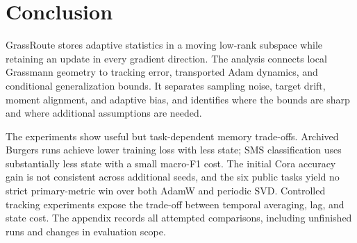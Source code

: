 \section{Conclusion}
GrassRoute stores adaptive statistics in a moving low-rank subspace while
retaining an update in every gradient direction. The analysis connects local
Grassmann geometry to tracking error, transported Adam dynamics, and
conditional generalization bounds. It separates sampling noise, target drift,
moment alignment, and adaptive bias, and identifies where the bounds are sharp
and where additional assumptions are needed.

The experiments show useful but task-dependent memory trade-offs. Archived
Burgers runs achieve lower training loss with less state; SMS classification
uses substantially less state with a small macro-F1 cost. The initial Cora
accuracy gain is not consistent across additional seeds, and the six public
tasks yield no strict primary-metric win over both AdamW and periodic SVD.
Controlled tracking experiments expose the trade-off between temporal
averaging, lag, and state cost. The appendix records all attempted comparisons,
including unfinished runs and changes in evaluation scope.
